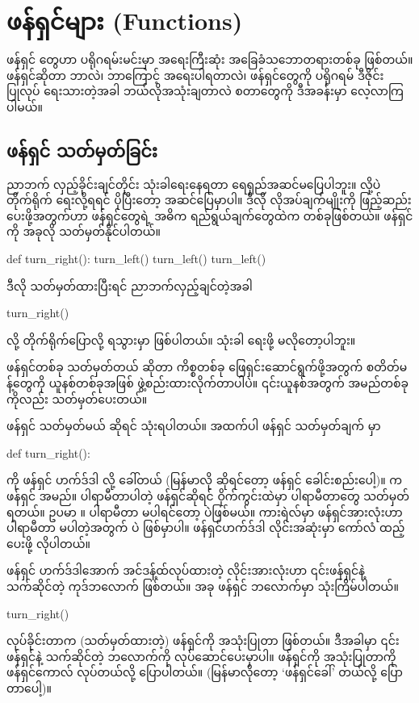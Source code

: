 \chapter{ဖန်ရှင်များ (Functions)}\label{ch:ch03}

ဖန်ရှင်  တွေဟာ ပရိုဂရမ်းမင်းမှာ အရေးကြီးဆုံး အခြေခံသဘောတရားတစ်ခု ဖြစ်တယ်။ ဖန်ရှင်ဆိုတာ ဘာလဲ၊ ဘာကြောင့် အရေးပါရတာလဲ၊ ဖန်ရှင်တွေကို ပရိုဂရမ် ဒီဇိုင်းပြုလုပ် ရေးသားတဲ့အခါ ဘယ်လိုအသုံးချတာလဲ စတာတွေကို ဒီအခန်းမှာ လေ့လာကြပါမယ်။

\section{ဖန်ရှင် သတ်မှတ်ခြင်း}
ညာဘက် လှည့်ခိုင်းချင်တိုင်း  သုံးခါရေးနေရတာ ရေရှည်အဆင်မပြေပါဘူး။  လို့ပဲ တိုက်ရိုက် ရေးလို့ရရင် ပိုပြီးတော့ အဆင်ပြေမှာပါ။ ဒီလို လိုအပ်ချက်မျိုးကို ဖြည့်ဆည်း ပေးဖို့အတွက်ဟာ ဖန်ရှင်တွေရဲ့ အဓိက ရည်ရွယ်ချက်တွေထဲက တစ်ခုဖြစ်တယ်။  ဖန်ရှင်ကို အခုလို သတ်မှတ်နိုင်ပါတယ်။
%
\begin{py}
def turn_right():
    turn_left()
    turn_left()
    turn_left()
\end{py}
%
ဒီလို သတ်မှတ်ထားပြီးရင် ညာဘက်လှည့်ချင်တဲ့အခါ 
%
\begin{py}
turn_right()
\end{py}
%
လို့ တိုက်ရိုက်ပြောလို့ ရသွားမှာ ဖြစ်ပါတယ်။  သုံးခါ ရေးဖို့ မလိုတော့ပါဘူး။

ဖန်ရှင်တစ်ခု သတ်မှတ်တယ်  ဆိုတာ ကိစ္စတစ်ခု ဖြေရှင်းဆောင်ရွက်ဖို့အတွက် စတိတ်မန့်တွေကို ယူနစ်တစ်ခုအဖြစ် ဖွဲ့စည်းထားလိုက်တာပါပဲ။ ၎င်းယူနစ်အတွက် အမည်တစ်ခုကိုလည်း သတ်မှတ်ပေးတယ်။ 

ဖန်ရှင် သတ်မှတ်မယ် ဆိုရင်   သုံးရပါတယ်။ အထက်ပါ  ဖန်ရှင် သတ်မှတ်ချက်  မှာ 
%
\begin{py}
def turn_right():
\end{py}
%
ကို ဖန်ရှင် ဟက်ဒ်ဒါ  လို့ ခေါ်တယ် (မြန်မာလို ဆိုရင်တော့ ဖန်ရှင် ခေါင်းစည်းပေါ့)။  က ဖန်ရှင် အမည်။ ပါရာမီတာပါတဲ့ ဖန်ရှင်ဆိုရင် ဝိုက်ကွင်းထဲမှာ ပါရာမီတာတွေ သတ်မှတ်ရတယ်။ ဥပမာ ။ ပါရာမီတာ မပါရင်တော့ \fEn{\fCode{()}} ပဲဖြစ်မယ်။ ကားရဲလ်မှာ ဖန်ရှင်အားလုံးဟာ ပါရာမီတာ မပါတဲ့အတွက် \fEn{\fCode{()}} ပဲ ဖြစ်မှာပါ။ ဖန်ရှင်ဟက်ဒ်ဒါ လိုင်းအဆုံးမှာ ကော်လံ  ထည့်ပေးဖို့ လိုပါတယ်။ 

ဖန်ရှင် ဟက်ဒ်ဒါအောက် အင်ဒန့်ထ်လုပ်ထားတဲ့ လိုင်းအားလုံးဟာ ၎င်းဖန်ရှင်နဲ့ သက်ဆိုင်တဲ့ ကုဒ်ဘလောက် ဖြစ်တယ်။ အခု  ဖန်ရှင် ဘလောက်မှာ  သုံးကြိမ်ပါတယ်။ 
%
\begin{py}
turn_right()
\end{py}
%
လုပ်ခိုင်းတာက (သတ်မှတ်ထားတဲ့) ဖန်ရှင်ကို အသုံးပြုတာ ဖြစ်တယ်။ ဒီအခါမှာ ၎င်းဖန်ရှင်နဲ့ သက်ဆိုင်တဲ့ ဘလောက်ကို လုပ်ဆောင်ပေးမှာပါ။ ဖန်ရှင်ကို အသုံးပြုတာကို ဖန်ရှင်ကောလ်  လုပ်တယ်လို့ ပြောပါတယ်။ (မြန်မာလိုတော့ ‘ဖန်ရှင်ခေါ်’ တယ်လို့ ပြောတာပေါ့)။

